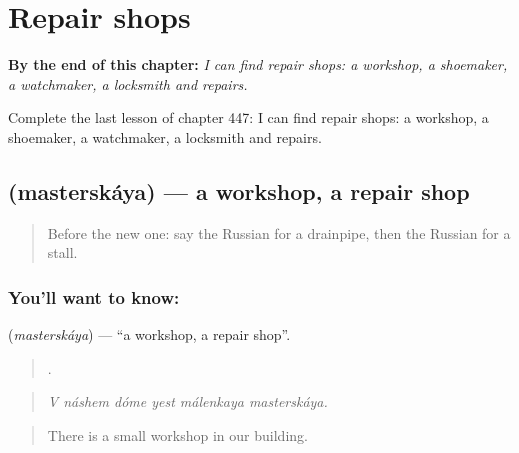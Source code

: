 
\chapter{Repair shops}
\label{ch:ru-repair-shops}

\begin{chapteropening}
\textbf{By the end of this chapter:} \emph{I can find repair shops: a workshop, a shoemaker, a watchmaker, a locksmith and repairs.}

Complete the last lesson of chapter 447: I can find repair shops: a workshop, a shoemaker, a watchmaker, a locksmith and repairs.
\end{chapteropening}

\section[\texorpdfstring{\ru{мастерская} (masterskáya)}{мастерская (masterskáya)}]{ (masterskáya) — a workshop, a repair shop}

\label{lesson:RU-C447-masterskaya}



\begin{quote}
Before the new one: say the Russian for a drainpipe, then the Russian for a stall.
\end{quote}

\subsection*{You'll want to know: }
\textbf{} (\emph{masterskáya}) — \textquotedblleft{}a workshop, a repair shop\textquotedblright{}.

\begin{quote}
     .
\end{quote}

\begin{quote}
\emph{V náshem dóme yest málenkaya masterskáya.}
\end{quote}

\begin{quote}
There is a small workshop in our building.
\end{quote}

